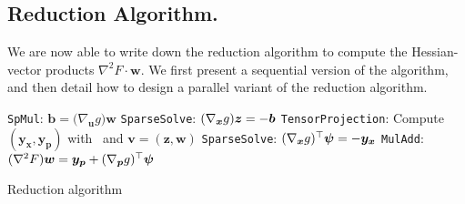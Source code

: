\subsection{Reduction Algorithm.}
\label{sec:reduction:algorithm}
We are now able to write down the reduction algorithm to compute the
Hessian-vector products $\nabla^2 F \cdot \bm{w}$. We first present a sequential
version of the algorithm, and then detail how to design a parallel variant
of the reduction algorithm.

\begin{algorithm2e}
  {\tt SpMul}: $\bm{b} = \big(\nabla_{\bm{u}}g  \big) \bm{w}$ \;
  {\tt SparseSolve}: $(\grad{g}{\bm{x}}) \bm{z} = - \bm{b}$ \;
  {\tt TensorProjection}: Compute $(\bm{y}_{\bm{x}}, \bm{y}_{\bm{p}})$ with~ and $\bm{v} = (\bm{z}, \bm{w})$\;
  {\tt SparseSolve}: $(\grad{g}{\bm{x}})^\top \bm{\psi} = - \bm{y}_{\bm{x}}$ \;
  {\tt MulAdd}: $(\nabla^2 F)\bm{w} = \bm{y}_{\bm{p}} + (\grad{g}{\bm{p}})^\top\bm{\psi}$ \;
 \caption{Reduction algorithm}
 \label{algo:reduction}
\end{algorithm2e}

